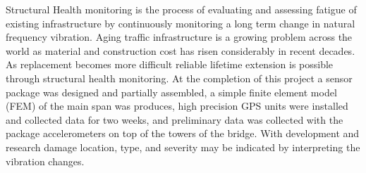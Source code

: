 Structural Health monitoring is the process of evaluating and assessing fatigue of existing infrastructure by continuously monitoring a long term change in
natural frequency vibration.
Aging traffic infrastructure is a growing problem across the world as material and construction cost has risen considerably in
recent decades.
As replacement becomes more difficult reliable lifetime extension is possible through structural health monitoring.
At the completion of this project a sensor package was designed and partially assembled, a simple finite element model (FEM) of the main span was produces, high precision
GPS units were installed and collected data for two weeks, and preliminary data was collected with the package accelerometers on top of the towers of
the bridge.
With development and research damage location, type, and severity may be indicated by interpreting the vibration changes. 


